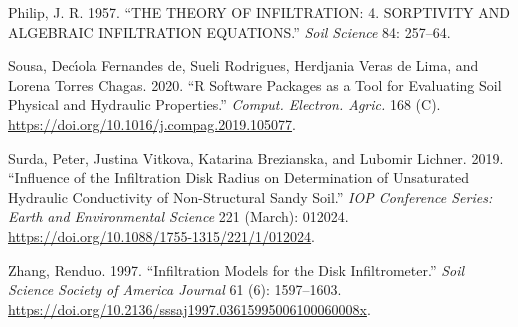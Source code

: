 \documentclass[
]{article}
\newlength{\cslhangindent}
\newlength{\cslentryspacingunit} %
\newenvironment{CSLReferences}[2] %
 {%
  \setlength{\parindent}{0pt}
  \ifodd #1
  \let\oldpar\par
  \def\par{\hangindent=\cslhangindent\oldpar}
  \fi
  \setlength{\parskip}{#2\cslentryspacingunit}
 }%
 {}
\begin{document}
\begin{CSLReferences}{1}{0}
\leavevmode{}%
Philip, J. R. 1957. {``THE THEORY OF INFILTRATION: 4. SORPTIVITY AND
ALGEBRAIC INFILTRATION EQUATIONS.''} \emph{Soil Science} 84: 257--64.

\leavevmode{}%
Sousa, Decı́ola Fernandes de, Sueli Rodrigues, Herdjania Veras de Lima,
and Lorena Torres Chagas. 2020. {``R Software Packages as a Tool for
Evaluating Soil Physical and Hydraulic Properties.''} \emph{Comput.
Electron. Agric.} 168 (C).
\url{https://doi.org/10.1016/j.compag.2019.105077}.

\leavevmode{}%
Surda, Peter, Justina Vitkova, Katarina Brezianska, and Lubomir Lichner.
2019. {``Influence of the Infiltration Disk Radius on Determination of
Unsaturated Hydraulic Conductivity of Non-Structural Sandy Soil.''}
\emph{{IOP} Conference Series: Earth and Environmental Science} 221
(March): 012024. \url{https://doi.org/10.1088/1755-1315/221/1/012024}.

\leavevmode{}%
Zhang, Renduo. 1997. {``Infiltration Models for the Disk
Infiltrometer.''} \emph{Soil Science Society of America Journal} 61 (6):
1597--1603.
\url{https://doi.org/10.2136/sssaj1997.03615995006100060008x}.

\end{CSLReferences}
\end{document}

